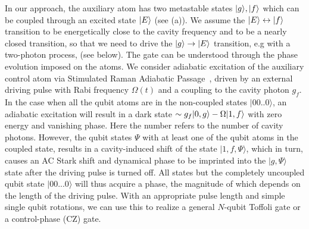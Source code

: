 In our approach, the auxiliary atom has two metastable states $| g \rangle,| f \rangle$
which can be coupled through an excited state $| E \rangle$ (see
(a)). We assume the $| E \rangle\leftrightarrow| f \rangle$ transition
to be energetically close to the cavity frequency and to be a nearly closed
transition,  so that we need to drive the $| g \rangle\to | E \rangle$ transition, e.g
with a two-photon process, (see below).
The gate can be understood through the phase evolution imposed on the atoms. We
consider adiabatic excitation of the auxiliary control atom via Stimulated Raman
Adiabatic Passage~\cite{stirap,stirap2}, driven by an external driving pulse
with Rabi frequency $\Omega(t)$ and a coupling to the cavity photon $g_{f}$. In
the case when all the qubit atoms are in the non-coupled states $|00..0\rangle$,
an adiabatic excitation will result in a dark state $\sim g_{f} | 0,g \rangle
-\Omega | 1,f \rangle$ with zero energy and vanishing phase. Here the number refers
to the number of cavity photons.  However, the qubit states $\Psi$ with at least
one of the qubit atoms in the coupled state, results in a cavity-induced shift
of the state $|1,f, \Psi\rangle$, which in turn, causes an AC Stark shift and
dynamical phase to be imprinted into the $|g,\Psi\rangle$ state after the
driving pulse is turned off. All states but the completely uncoupled qubit state
$|00...0\rangle$ will thus acquire a phase, the magnitude of which depends on
the length of the driving pulse. With an appropriate pulse length and simple
single qubit rotations, we can use this to realize a general $N$-qubit Toffoli
gate or a control-phase (CZ) gate.

